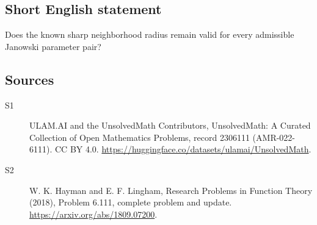 \documentclass[11pt]{article}
\begin{document}
\subsection{Short English statement}
Does the known sharp neighborhood radius remain valid for every admissible Janowski parameter pair?
\subsection{Sources}
\begin{description}
\item[\hypertarget{source:2306111:1}{S1}] ULAM.AI and the UnsolvedMath Contributors, UnsolvedMath: A Curated Collection of Open Mathematics Problems, record 2306111 (AMR-022-6111). CC BY 4.0. \url{https://huggingface.co/datasets/ulamai/UnsolvedMath}.
\item[\hypertarget{source:2306111:2}{S2}] W. K. Hayman and E. F. Lingham, Research Problems in Function Theory (2018), Problem 6.111, complete problem and update. \url{https://arxiv.org/abs/1809.07200}.
\end{description}
\label{end:2306111}
\end{document}
